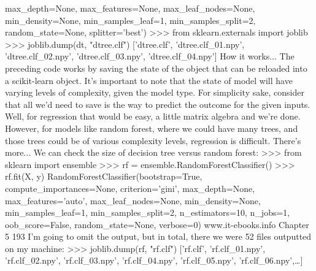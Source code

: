 max_depth=None, max_features=None,
max_leaf_nodes=None, min_density=None,
min_samples_leaf=1, min_samples_split=2,
random_state=None, splitter='best')
>>> from sklearn.externals import joblib
>>> joblib.dump(dt, "dtree.clf")
['dtree.clf',
'dtree.clf_01.npy',
'dtree.clf_02.npy',
'dtree.clf_03.npy',
'dtree.clf_04.npy']
How it works...
The preceding code works by saving the state of the object that can be reloaded into a
scikit-learn object. It's important to note that the state of model will have varying levels
of complexity, given the model type.
For simplicity sake, consider that all we'd need to save is the way to predict the outcome
for the given inputs. Well, for regression that would be easy, a little matrix algebra and
we're done. However, for models like random forest, where we could have many trees,
and those trees could be of various complexity levels, regression is difficult.
There's more...
We can check the size of decision tree versus random forest:
>>> from sklearn import ensemble
>>> rf = ensemble.RandomForestClassifier()
>>> rf.fit(X, y)
RandomForestClassifier(bootstrap=True, compute_importances=None,
criterion='gini', max_depth=None,
max_features='auto', max_leaf_nodes=None,
min_density=None, min_samples_leaf=1,
min_samples_split=2, n_estimators=10,
n_jobs=1, oob_score=False, random_state=None,
verbose=0)
www.it-ebooks.info
Chapter 5
193
I'm going to omit the output, but in total, there we were 52 files outputted on my machine:
>>> joblib.dump(rf, "rf.clf")
['rf.clf',
'rf.clf_01.npy',
'rf.clf_02.npy',
'rf.clf_03.npy',
'rf.clf_04.npy',
'rf.clf_05.npy',
'rf.clf_06.npy',…]
